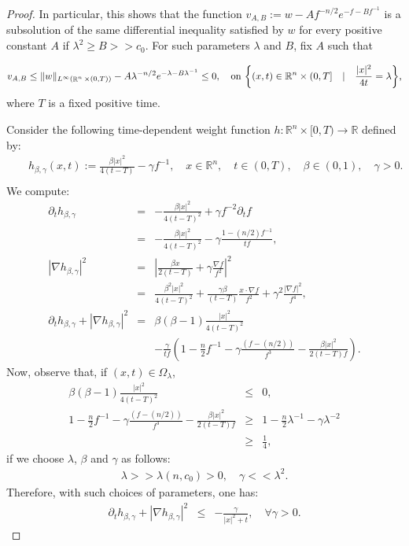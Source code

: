 \documentclass[a4paper,11pt,reqno]{amsart}
\def\R{\mathop{\rm \mathbb{R}}\nolimits}
\begin{document}
\begin{proof}
In particular, this shows that the function $v_{A,B}:=w-Af^{-n/2}e^{-f-Bf^{-1}}$ is a subsolution of the same differential inequality satisfied by $w$ for every positive constant $A$ if $\lambda^2\geq B>>c_0.$
For such parameters $\lambda$ and $B$, fix $A$ such that 

\begin{eqnarray}
v_{A,B}\leq \|w\|_{L^{\infty}(\R^n\times(0,T))}-A\lambda^{-n/2}e^{-\lambda-B\lambda^{-1}}\leq 0,\quad\text{on $\left\{(x,t)\in \mathbb{R}^n\times (0,T]\quad|\quad\frac{|x|^2}{4t}=\lambda\right\}$,}\label{cond-bdy}
\end{eqnarray}
where $T$ is a fixed positive time. 

Consider the following time-dependent weight function $h:\mathbb{R}^n\times[0,T)\rightarrow \mathbb{R} $ defined by:
\begin{eqnarray*}
&&h_{\beta,\gamma}(x,t):=\frac{\beta|x|^2}{{4(t-T)}}-\gamma f^{-1},\quad x\in \mathbb{R}^n,\quad t\in(0,T),\quad \beta\in (0,1),\quad \gamma>0.\\
\end{eqnarray*}
We compute:
\begin{eqnarray}\label{ham-jac-equ}
\partial_th_{\beta,\gamma}&=&-\frac{\beta|x|^2}{{4(t-T)^2}}+\gamma f^{-2}\partial_tf\\
&=&-\frac{\beta|x|^2}{{4(t-T)^2}}-\gamma\frac{1-(n/2)f^{-1}}{tf},\\
|\nabla h_{\beta,\gamma}|^2&=&\left|\frac{\beta x}{2(t-T)}+\gamma\frac{\nabla f}{f^2}\right|^2\\
&=&\frac{\beta^2|x|^2}{4(t-T)^2}+\frac{\gamma\beta}{(t-T)}\frac{x\cdot \nabla f}{f^2}+\gamma^2\frac{|\nabla f|^2}{f^4},\\
\partial_th_{\beta,\gamma}+|\nabla h_{\beta,\gamma}|^2&=&\beta(\beta-1)\frac{|x|^2}{4(t-T)^2}\\
&&-\frac{\gamma}{tf}\left(1-\frac{n}{2}f^{-1}-\gamma\frac{(f-(n/2))}{f^3}-\frac{\beta|x|^2}{2(t-T)f}\right).
\end{eqnarray}
Now, observe that, if $(x,t)\in\Omega_{\lambda}$,
\begin{eqnarray*}
\beta(\beta-1)\frac{|x|^2}{4(t-T)^2}&\leq& 0,\\
1-\frac{n}{2}f^{-1}-\gamma\frac{(f-(n/2))}{f^3}-\frac{\beta|x|^2}{2(t-T)f}&\geq&1-\frac{n}{2}\lambda^{-1}-\gamma\lambda^{-2}\\
&\geq& \frac{1}{4},
\end{eqnarray*}
if we choose $\lambda$, $\beta$ and $\gamma$ as follows:
\begin{eqnarray*}
\lambda>>\lambda(n,c_0)>0,\quad \gamma<< \lambda^2.
\end{eqnarray*}
 Therefore, with such choices of parameters, one has:
\begin{eqnarray*}
\partial_th_{\beta,\gamma}+|\nabla h_{\beta,\gamma}|^2&\leq&-\frac{\gamma}{|x|^2+t},\quad \forall \gamma>0.
\end{eqnarray*}



\end{proof}
\end{document}
